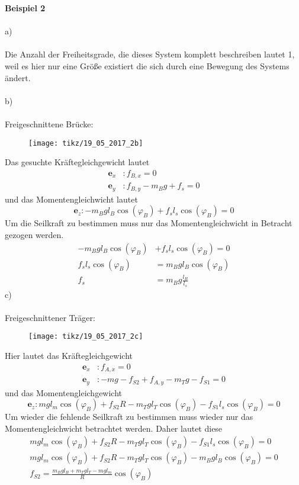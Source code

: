\textbf{Beispiel 2}\\ \\
a)\\ \\
Die Anzahl der Freiheitsgrade, die dieses System komplett beschreiben lautet 1, weil es hier nur eine Größe existiert die sich durch eine Bewegung des Systems ändert.\\ \\
b)\\ \\
Freigeschnittene Brücke:
\begin{figure}[h]
	\centering
	\texttt{[image: tikz/19\_05\_2017\_2b]}
\end{figure}
\newline
Das gesuchte Kräftegleichgewicht lautet
\begin{align*}
	\textbf{e}_x &: f_{B,x} = 0 \\
	\textbf{e}_y &: f_{B,y} - m_Bg + f_s = 0
\end{align*}
und das Momentengleichwicht lautet
\[
	\textbf{e}_z : -m_Bgl_B\cos(\varphi_B) + f_sl_s\cos(\varphi_B) = 0
\]
Um die Seilkraft zu bestimmen muss nur das Momentengleichwicht in Betracht gezogen werden.
\begin{align*}
	-m_Bgl_B\cos(\varphi_B) &+ f_sl_s\cos(\varphi_B) = 0 \\ 
	 f_sl_s\cos(\varphi_B) &= m_Bgl_B\cos(\varphi_B) \\
	 f_s &=  m_Bg\frac{l_B}{l_s}
\end{align*}
\newpage
\noindent
c) \\ \\
Freigeschnittener Träger:
\begin{figure}[h]
	\centering
	\texttt{[image: tikz/19\_05\_2017\_2c]}
\end{figure}
\newline
Hier lautet das Kräftegleichgewicht
\begin{align*}
	\textbf{e}_x &: f_{A,x} = 0 \\
	\textbf{e}_y &: -mg - f_{S2} + f_{A,y} - m_Tg - f_{S1} = 0
\end{align*}
und das Momentengleichgewicht
\[
	\textbf{e}_z: mgl_m\cos(\varphi_B) + f_{S2}R - m_Tgl_T\cos(\varphi_B) - f_{S1}l_s\cos(\varphi_B) = 0
\]
Um wieder die fehlende Seilkraft zu bestimmen muss wieder nur das Momentengleichwicht betrachtet werden. Daher lautet diese
\begin{align*}
	mgl_m\cos(\varphi_B) + f_{S2}R - m_Tgl_T\cos(\varphi_B) - f_{S1}l_s\cos(\varphi_B) = 0 \\
	mgl_m\cos(\varphi_B) + f_{S2}R - m_Tgl_T\cos(\varphi_B) - m_Bgl_B\cos(\varphi_B) = 0 \\
	f_{S2} = \frac{m_Bgl_B + m_Tgl_T - mgl_m}{R}\cos(\varphi_B)
\end{align*}
